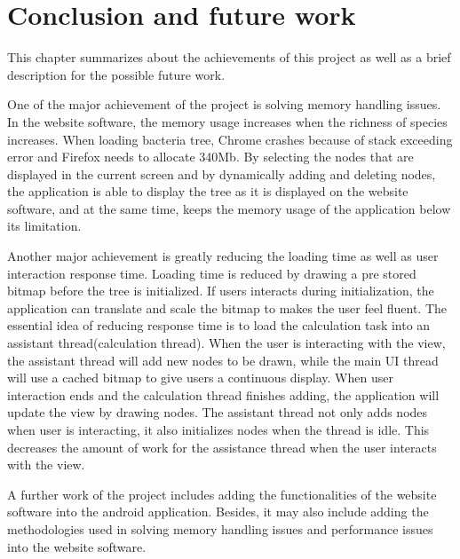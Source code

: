 \documentclass[MSc]{icldt}
\begin{document}
\chapter{Conclusion and future work}

This chapter summarizes about the achievements of this project as well as a brief description for the possible future work.

One of the major achievement of the project is solving memory handling issues. In the website software, the memory usage increases when the richness of species increases. When loading bacteria tree, Chrome crashes because of stack exceeding error and Firefox needs to allocate 340Mb. By selecting the nodes that are displayed in the current screen and by dynamically adding and deleting nodes, the application is able to display the tree as it is displayed on the website software, and at the same time, keeps the memory usage of the application below its limitation.

Another major achievement is greatly reducing the loading time as well as user interaction response time. Loading time is reduced by drawing a pre stored bitmap before the tree is initialized. If users interacts during initialization, the application can translate and scale the bitmap to makes the user feel fluent. The essential idea of reducing response time is to load the calculation task into an assistant thread(calculation thread). When the user is interacting with the view, the assistant thread will add new nodes to be drawn, while the main UI thread will use a cached bitmap to give users a continuous display. When user interaction ends and the calculation thread finishes adding, the application will update the view by drawing nodes. The assistant thread not only adds nodes when user is interacting, it also initializes nodes when the thread is idle. This decreases the amount of work for the assistance thread when the user interacts with the view.

A further work of the project includes adding the functionalities of the website software into the android application. Besides, it may also include adding the methodologies used in solving memory handling issues and performance issues into the website software.






{}

\end{document}
